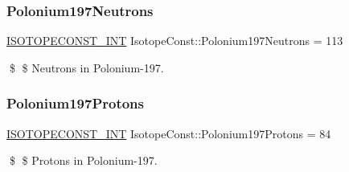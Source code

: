 \subsubsection{\texorpdfstring{Polonium197\+Neutrons}{Polonium197Neutrons}}
{\footnotesize\ttfamily \mbox{\hyperlink{group___isotope_const-_macros_ga5f18360b3e99483a35c32d789e62621c}{I\+S\+O\+T\+O\+P\+E\+C\+O\+N\+S\+T\+\_\+\+I\+NT}} Isotope\+Const\+::\+Polonium197\+Neutrons = 113}

\$ \$ Neutrons in Polonium-\/197. \mbox{\label{group___isotope_const-_polonium-_po197_ga1306698747c1e4755c634baee6861b77}} 
\subsubsection{\texorpdfstring{Polonium197\+Protons}{Polonium197Protons}}
{\footnotesize\ttfamily \mbox{\hyperlink{group___isotope_const-_macros_ga5f18360b3e99483a35c32d789e62621c}{I\+S\+O\+T\+O\+P\+E\+C\+O\+N\+S\+T\+\_\+\+I\+NT}} Isotope\+Const\+::\+Polonium197\+Protons = 84}

\$ \$ Protons in Polonium-\/197. 